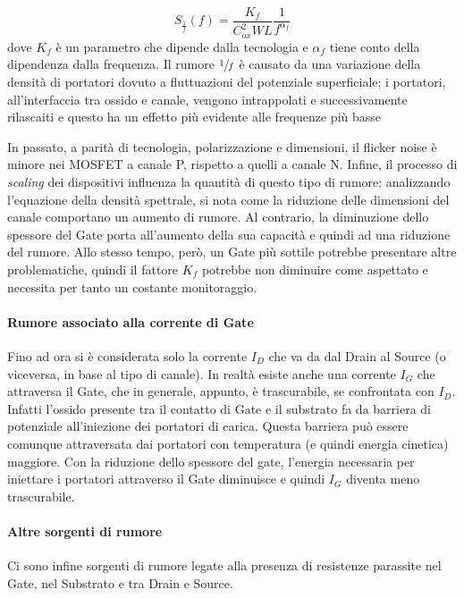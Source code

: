 \begin{equation}
  S_{\frac{1}{f}} \left(f\right) = \frac{K_f}{C_{ox}^2 W L} \frac{1}{f^{\alpha_f}}
\end{equation}
dove $K_f$ è un parametro che dipende dalla tecnologia e $\alpha_f$ tiene conto della dipendenza dalla frequenza.
Il rumore $\sfrac{1}{f}$ è causato da una variazione della densità di portatori dovuto a fluttuazioni del potenziale superficiale; i portatori, all'interfaccia tra ossido e canale, vengono intrappolati e successivamente rilascaiti e questo ha un effetto più evidente alle frequenze più basse

In passato, a parità di tecnologia, polarizzazione e dimensioni, il flicker noise è minore nei MOSFET a canale P, rispetto a quelli a canale N. Infine, il processo di \emph{scaling} dei dispositivi influenza la quantità di questo tipo di rumore: analizzando l'equazione della densità spettrale, si nota come la riduzione delle dimensioni del canale comportano un aumento di rumore. Al contrario, la diminuzione dello spessore del Gate porta all'aumento della sua capacità e quindi ad una riduzione del rumore. Allo stesso tempo, però, un Gate più sottile potrebbe presentare altre problematiche, quindi il fattore $K_f$ potrebbe non diminuire come aspettato e necessita per tanto un costante monitoraggio. 

\paragraph*{Rumore associato alla corrente di Gate}
Fino ad ora si è considerata solo la corrente $I_D$ che va da dal Drain al Source (o viceversa, in base al tipo di canale). In realtà esiste anche una corrente $I_G$ che attraversa il Gate, che in generale, appunto, è trascurabile, se confrontata con  $I_D$. Infatti l'ossido presente tra il contatto di Gate e il substrato fa da barriera di potenziale all'iniezione dei portatori di carica. Questa barriera può essere comunque attraversata dai portatori con temperatura (e quindi energia cinetica) maggiore. Con la riduzione dello spessore del gate, l'energia necessaria per iniettare i portatori attraverso il Gate diminuisce e quindi $I_G$ diventa meno trascurabile.

\paragraph*{Altre sorgenti di rumore}
Ci sono infine sorgenti di rumore legate alla presenza di resistenze parassite nel Gate, nel Substrato e tra Drain e Source.